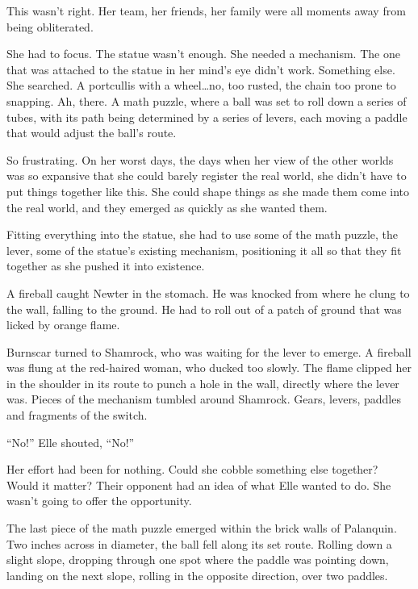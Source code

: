 This wasn't right.  Her team, her friends, her family were all moments away from being obliterated.



She had to focus.  The statue wasn't enough.  She needed a mechanism.  The one that was attached to the statue in her mind's eye didn't work.  Something else.  She searched. A portcullis with a wheel\ldots no, too rusted, the chain too prone to snapping.  Ah, there.  A math puzzle, where a ball was set to roll down a series of tubes, with its path being determined by a series of levers, each moving a paddle that would adjust the ball's route.



So frustrating.  On her worst days, the days when her view of the other worlds was so expansive that she could barely register the real world, she didn't have to put things together like this.  She could shape things as she made them come into the real world, and they emerged as quickly as she wanted them.



Fitting everything into the statue, she had to use some of the math puzzle, the lever, some of the statue's existing mechanism, positioning it all so that they fit together as she pushed it into existence.



A fireball caught Newter in the stomach.  He was knocked from where he clung to the wall, falling to the ground.  He had to roll out of a patch of ground that was licked by orange flame.



Burnscar turned to Shamrock, who was waiting for the lever to emerge.  A fireball was flung at the red-haired woman, who ducked too slowly.  The flame clipped her in the shoulder in its route to punch a hole in the wall, directly where the lever was.  Pieces of the mechanism tumbled around Shamrock.  Gears, levers, paddles and fragments of the switch.



``No!''  Elle shouted, ``No!''



Her effort had been for nothing.  Could she cobble something else together?  Would it matter?  Their opponent had an idea of what Elle wanted to do.  She wasn't going to offer the opportunity.



The last piece of the math puzzle emerged within the brick walls of Palanquin.  Two inches across in diameter, the ball fell along its set route.  Rolling down a slight slope, dropping through one spot where the paddle was pointing down, landing on the next slope, rolling in the opposite direction, over two paddles.



